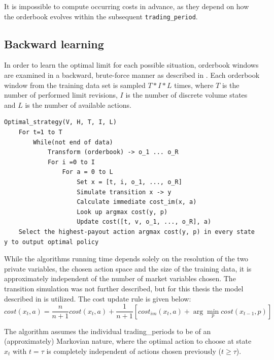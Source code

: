 It is impossible to compute occurring costs in advance, as they depend on how the orderbook evolves within the subsequent \lstinline!trading_period!.


\subsection{Backward learning}
\label{chap:backwardlearning}
In order to learn the optimal limit for each possible situation, orderbook windows are examined in a backward, brute-force manner as described in . Each orderbook window from the training data set is sampled $T*I*L$ times, where $T$ is the number of performed limit revisions, $I$ is the number of discrete volume states and $L$ is the number of available actions.\\

\begin{lstlisting}[frame=single, breaklines=true, basicstyle=\scriptsize, caption=Brute-Force strategy learning approach as described in \Cite{Nevmyvaka:2006}., label=lst:bruteforce:pseudocode]
Optimal_strategy(V, H, T, I, L)
    For t=1 to T
        While(not end of data)
            Transform (orderbook) -> o_1 ... o_R
            For i =0 to I
                For a = 0 to L
                    Set x = [t, i, o_1, ..., o_R]
                    Simulate transition x -> y
                    Calculate immediate cost_im(x, a)
                    Look up argmax cost(y, p)
                    Update cost([t, v, o_1, ..., o_R], a)
    Select the highest-payout action argmax cost(y, p) in every state y to output optimal policy
\end{lstlisting}

While the algorithms running time depends solely on the resolution of the two private variables, the chosen action space and the size of the training data, it is approximately independent of the number of market variables chosen. The transition simulation was not further described, but for this thesis the model described in  is utilized. The cost update rule is given below: 
\begin{equation}\label{eq:costfunction}
   cost(x_t, a) = \dfrac{n}{n+1} cost(x_t, a) + \dfrac{1}{n+1} [cost_{im}(x_t,a) + \arg\min_{p}cost(x_{t-1}, p)]
\end{equation}

The algorithm assumes the individual trading\_periods to be of an (approximately) Markovian nature, where the optimal action to choose at state $x_t$ with $t = \tau$ is completely independent of actions chosen previously ($t \geq \tau$).\\

